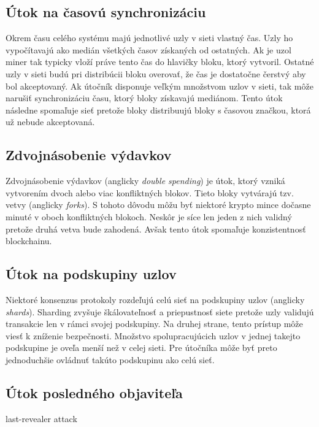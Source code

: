 \subsection{Útok na časovú synchronizáciu}
Okrem času celého systému majú jednotlivé uzly v sieti vlastný čas. Uzly ho vypočítavajú ako medián všetkých časov získaných od ostatných. Ak je uzol miner tak typicky vloží práve tento čas do hlavičky bloku, ktorý vytvoril. Ostatné uzly v sieti budú pri distribúcii bloku overovať, že čas je dostatočne čerstvý aby bol akceptovaný. Ak útočník disponuje veľkým množstvom uzlov v sieti, tak môže narušiť synchronizáciu času, ktorý bloky získavajú mediánom. Tento útok následne spomaľuje sieť pretože bloky distribuujú bloky s časovou značkou, ktorá už nebude akceptovaná.

\subsection{Zdvojnásobenie výdavkov}

Zdvojnásobenie výdavkov (anglicky \textit{double spending}) je útok, ktorý vzniká vytvorením dvoch alebo viac konfliktných blokov. Tieto bloky vytvárajú tzv. vetvy (anglicky \textit{forks}). S tohoto dôvodu môžu byť niektoré krypto mince dočasne minuté v oboch konfliktných blokoch. Neskôr je síce len jeden z nich validný pretože druhá vetva bude zahodená. Avšak tento útok spomaľuje konzistentnosť blockchainu.

\subsection{Útok na podskupiny uzlov}\label{subsec:shard-attack}

Niektoré konsenzus protokoly rozdeľujú celú sieť na podskupiny uzlov (anglicky \textit{shards}). Sharding zvyšuje škálovateľnosť a priepustnosť siete pretože uzly validujú transakcie len v rámci svojej podskupiny. Na druhej strane, tento prístup môže viesť k zníženie bezpečnosti. Množstvo spolupracujúcich uzlov v jednej takejto podskupine je oveľa menší než v celej sieti. Pre útočníka môže byť preto jednoduchšie ovládnuť takúto podskupinu ako celú sieť.

\subsection{Útok posledného objaviteľa}\label{subsec:lst-re-attack}

last-revealer attack~\cite{lastRevealerAttack}

